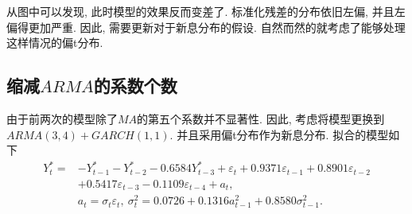 \documentclass[12pt]{article}
\begin{document}
\qquad 从图中可以发现, 此时模型的效果反而变差了. 标准化残差的分布依旧左偏, 并且左偏得更加严重. 因此, 需要更新对于新息分布的假设. 自然而然的就考虑了能够处理这样情况的偏t分布.

\subsection{缩减$ARMA$的系数个数}
\qquad 由于前两次的模型除了$MA$的第五个系数并不显著性. 因此, 考虑将模型更换到$ARMA(3,4)+GARCH(1,1)$. 并且采用偏t分布作为新息分布. 拟合的模型如下
\[
    \begin{aligned}
        Y_{t}^*=&-Y_{t-1}^*-Y_{t-2}^*-0.6584Y_{t-3}^*+\varepsilon_{t}+0.9371\varepsilon_{t-1}+ 0.8901\varepsilon_{t-2}\\&+ 0.5417\varepsilon_{t-3}-0.1109\varepsilon_{t-4}+a_{t},\\&a_{t}=\sigma_{t} \varepsilon_{t},\ \sigma_{t}^{2} =0.0726+  0.1316 a_{t-1}^{2}+ 0.8580 \sigma_{t-1}^{2}.
    \end{aligned}
\]
\end{document}
